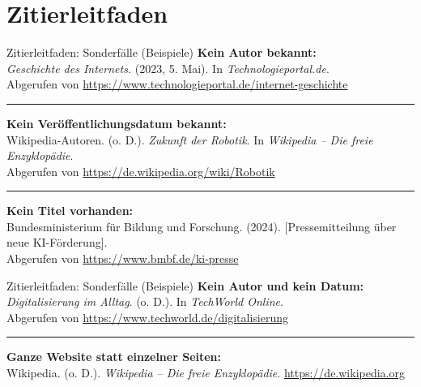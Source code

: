 \documentclass[aspectratio=169,10pt]{beamer}
\begin{document}
\section{Zitierleitfaden}
\begin{frame}{Zitierleitfaden: Sonderfälle (Beispiele)}
\small
\textbf{Kein Autor bekannt:}\\[2pt]
\textit{Geschichte des Internets.} (2023, 5. Mai). In \textit{Technologieportal.de}.\\
Abgerufen von \url{https://www.technologieportal.de/internet-geschichte}

\vspace{0.5\baselineskip}\hrule\vspace{0.5\baselineskip}

\textbf{Kein Veröffentlichungsdatum bekannt:}\\[2pt]
Wikipedia-Autoren. (o. D.). \textit{Zukunft der Robotik}. In \textit{Wikipedia – Die freie Enzyklopädie}.\\
Abgerufen von \url{https://de.wikipedia.org/wiki/Robotik}

\vspace{0.5\baselineskip}\hrule\vspace{0.5\baselineskip}

\textbf{Kein Titel vorhanden:}\\[2pt]
Bundesministerium für Bildung und Forschung. (2024). {[}Pressemitteilung über neue KI-Förderung{]}.\\
Abgerufen von \url{https://www.bmbf.de/ki-presse}

\end{frame}

\begin{frame}{Zitierleitfaden: Sonderfälle (Beispiele)}
\small
\textbf{Kein Autor und kein Datum:}\\[2pt]
\textit{Digitalisierung im Alltag}. (o. D.). In \textit{TechWorld Online}.\\
Abgerufen von \url{https://www.techworld.de/digitalisierung}

\vspace{0.5\baselineskip}\hrule\vspace{0.5\baselineskip}

\textbf{Ganze Website statt einzelner Seiten:}\\[2pt]
Wikipedia. (o. D.). \textit{Wikipedia – Die freie Enzyklopädie}. \url{https://de.wikipedia.org}
\end{frame}
\end{document}
